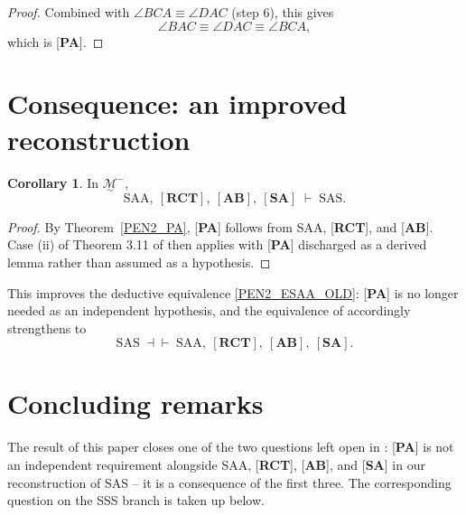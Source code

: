 \documentclass[11pt,a4paper]{article}
\theoremstyle{definition}
\newtheorem{cor}[thm]{Corollary}
\theoremstyle{remark}
\numberwithin{equation}{section}
\newcommand{\MG}{\underset{\sim}{\mathcal{M}}}
\begin{document}
\begin{proof}
Combined with $\angle BCA\equiv\angle DAC$ (step 6), this gives
\begin{equation*}
\angle BAC\equiv\angle DAC\equiv\angle BCA,
\end{equation*}
which is [\textbf{PA}].
\end{proof}

\section{Consequence: an improved reconstruction}\label{PEN2_s4}

\begin{cor}\label{PEN2_MAIN}
In $\MG^{-}$,
\begin{equation*}
\textrm{SAA},\ [\textbf{RCT}],\ [\textbf{AB}],\ [\textbf{SA}]\;\vdash\;\textrm{SAS}.
\end{equation*}
\end{cor}
\begin{proof}
By Theorem~\ref{PEN2_PA}, [\textbf{PA}] follows from SAA, [\textbf{RCT}], and [\textbf{AB}]. Case
(ii) of Theorem 3.11 of \cite[Section~3]{Volpe2026I} then applies with
[\textbf{PA}] discharged
as a derived lemma rather than assumed as a hypothesis.
\end{proof}

This improves the deductive equivalence \eqref{PEN2_ESAA_OLD}: [\textbf{PA}] is no longer
needed as an independent hypothesis, and the equivalence of \cite{Volpe2026I} accordingly
strengthens to
\begin{equation}\label{PEN2_ESAA_NEW}
\textrm{SAS}\;\dashv\vdash\;\textrm{SAA},\ [\textbf{RCT}],\ [\textbf{AB}],\ [\textbf{SA}].
\end{equation}

\section{Concluding remarks}\label{PEN2_s5}

The result of this paper closes one of the two questions left open in
\cite{Volpe2026I}: [\textbf{PA}] is not an independent requirement alongside SAA,
[\textbf{RCT}], [\textbf{AB}], and [\textbf{SA}] in our reconstruction of SAS -- it is a
consequence of the first three. The corresponding question on the SSS branch is taken up
below.
\end{document}
